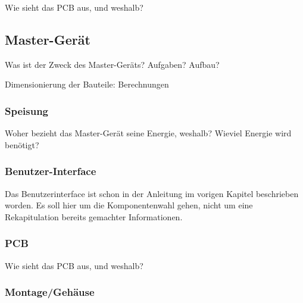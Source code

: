 Wie sieht das PCB aus, und weshalb?

\subsection{Master-Ger\"at}
\label{subsec:hw:mastergerat}

Was ist der Zweck des Master-Ger\"ats? Aufgaben? Aufbau?

\anweisung Dimensionierung der Bauteile: Berechnungen


\subsubsection{Speisung}
\label{subsubsec:mastergerat:speisung}

Woher bezieht das Master-Ger\"at  seine Energie, weshalb? Wieviel Energie wird
ben\"otigt?


\subsubsection{Benutzer-Interface}
\label{subsubsec:mastergerat:interface}

\anweisung Das Benutzerinterface ist schon in der Anleitung im vorigen Kapitel
beschrieben worden. Es soll  hier um die Komponentenwahl gehen,  nicht um eine
Rekapitulation bereits gemachter Informationen.

\subsubsection{PCB}
\label{subsubsec:mastergerat:pcb}

Wie sieht das PCB aus, und weshalb?

\subsubsection{Montage/Geh\"ause}
\label{subsubsec:mastergerat:pcb}

